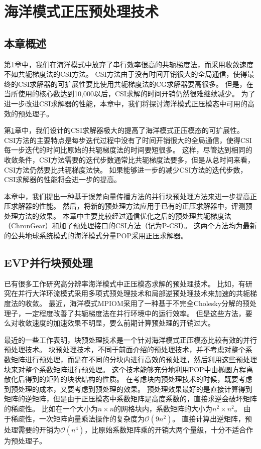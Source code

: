 \chapter{海洋模式正压预处理技术}
\label{cha:precond}

\section{本章概述}

第\ref{cha:precond}章中，我们在海洋模式中放弃了串行效率很高的共轭梯度法，而采用收敛速度不如共轭梯度法的CSI方法。
CSI方法由于没有时间开销很大的全局通信，使得最终的CSI求解器的可扩展性要比使用共轭梯度法的CG求解器要高很多。
但是，在当所使用的核心数达到10,000以后，CSI求解的时间开销仍然很难继续减少。 
为了进一步改进CSI求解器的性能，本章中，我们将探讨海洋模式正压模态中可用的高效的预处理子。

第\ref{cha:precond}章中，我们设计的CSI求解器极大的提高了海洋模式正压模态的可扩展性。
CSI方法的主要特点是每步迭代过程中没有了时间开销很大的全局通信，使得CSI每一步迭代的时间比原始的共轭梯度法的时间要短很多。 
这样，尽管达到相同的收敛条件，CSI方法需要的迭代步数通常比共轭梯度法要多，但是从总时间来看，CSI方法仍然要比共轭梯度法快。
如果能够进一步的减少CSI方法的迭代步数，CSI求解器的性能将会进一步的提高。

本章中，我们提出一种基于误差向量传播方法的并行块预处理方法来进一步提高正压求解器的性能。
然后，将新的预处理方法应用于已有的正压求解器中，评测预处理方法的效果。
本章中主要比较经过通信优化之后的预处理共轭梯度法（ChronGear）和加了预处理接口的CSI方法（记为P-CSI）。
这两个方法均为最新的公共地球系统模式的海洋模式分量POP采用正压求解器\cite{yong2015}。 


\section{EVP并行块预处理} 
\label{precond:EVP}

已有很多工作研究高分辨率海洋模式中正压模态求解的预处理技术。 
比如，有研究在并行大洋环流模式采用多项式预处理技术和局部逆预处理技术来加速的共轭梯度法的收敛\cite{smith1992parallel}。 
最近，海洋模式MPIOM采用了一种基于不完全Cholesky分解的预处理子，一定程度改善了共轭梯度法在并行环境中的运行效率\cite{adamidis2011high}。
但是这些方法，要么对收敛速度的加速效果不明显，要么前期计算预处理的开销过大。 

最近的一些工作表明，块预处理技术是一个针对海洋模式正压模态比较有效的并行预处理技术\cite{concus1985block, white2011block}。
块预处理技术，不同于前面介绍的预处理技术，并不考虑对整个系数矩阵进行预处理，而是在不同的分块内进行高效的预处理，然后利用这些预处理块来对整个系数矩阵进行预处理。 
这个技术能够充分地利用POP中由椭圆方程离散化后得到的矩阵的块状结构的性质。
在考虑块内预处理技术的时候，既要考虑到预处理的成本，又要考虑到预处理的效果。
预处理效果最好的是直接计算得到矩阵的逆矩阵，但是由于正压模态中系数矩阵是高度系数的，直接求逆会破坏矩阵的稀疏性。
比如在一个大小为$n\times n$的网格块内，系数矩阵的大小为$n^2\times n^2$。
由于稀疏性，一次矩阵向量乘法操作的复杂度为$\mathcal{O}(9n^2)$。 
直接计算出逆矩阵，预处理需要的开销为$\mathcal{O}(n^4)$，比原始系数矩阵乘的开销大两个量级，十分不适合作为预处理子。

